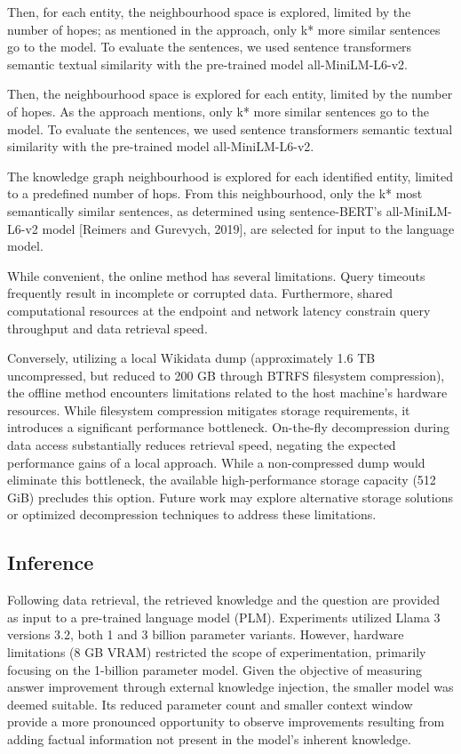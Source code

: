 \documentclass{article}
\begin{document}
Then, for each entity, the neighbourhood space is explored, limited by the number of hopes; as mentioned in the approach, only k* more similar sentences go to the model. To evaluate the sentences, we used sentence transformers\cite{reimers-2019-sentence-bert} semantic textual similarity with the pre-trained model all-MiniLM-L6-v2.

Then, the neighbourhood space is explored for each entity, limited by the number of hopes. As the approach mentions, only k* more similar sentences go to the model. To evaluate the sentences, we used sentence transformers\cite{reimers-2019-sentence-bert} semantic textual similarity with the pre-trained model all-MiniLM-L6-v2.

The knowledge graph neighbourhood is explored for each identified entity, limited to a predefined number of hops. From this neighbourhood, only the k* most semantically similar sentences, as determined using sentence-BERT's all-MiniLM-L6-v2 model [Reimers and Gurevych, 2019], are selected for input to the language model.

While convenient, the online method has several limitations. Query timeouts frequently result in incomplete or corrupted data. Furthermore, shared computational resources at the endpoint and network latency constrain query throughput and data retrieval speed.

Conversely, utilizing a local Wikidata dump (approximately 1.6 TB uncompressed, but reduced to 200 GB through BTRFS filesystem compression), the offline method encounters limitations related to the host machine's hardware resources. While filesystem compression mitigates storage requirements, it introduces a significant performance bottleneck. On-the-fly decompression during data access substantially reduces retrieval speed, negating the expected performance gains of a local approach. While a non-compressed dump would eliminate this bottleneck, the available high-performance storage capacity (512 GiB) precludes this option. Future work may explore alternative storage solutions or optimized decompression techniques to address these limitations.

\subsection{Inference}

Following data retrieval, the retrieved knowledge and the question are provided as input to a pre-trained language model (PLM). Experiments utilized Llama 3\cite{grattafiori2024llama3herdmodels} versions 3.2, both 1 and 3 billion parameter variants. However, hardware limitations (8 GB VRAM) restricted the scope of experimentation, primarily focusing on the 1-billion parameter model. Given the objective of measuring answer improvement through external knowledge injection, the smaller model was deemed suitable. Its reduced parameter count and smaller context window provide a more pronounced opportunity to observe improvements resulting from adding factual information not present in the model's inherent knowledge.
\end{document}
